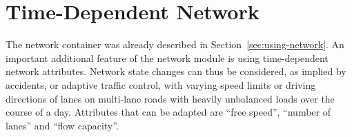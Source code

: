 


\section{Time-Dependent Network}
\label{sec:extending-network}

The network container was already described in Section~\ref{sec:using-network}.
%
An important additional feature of the network module is using time-dependent network attributes. Network state changes can thus be considered, as \eg implied by accidents, or adaptive traffic control, with varying speed limits or driving directions of lanes on multi-lane roads with heavily unbalanced loads over the course of a day. Attributes that can be adapted are ``free speed'', ``number of lanes'' and ``flow capacity''.

